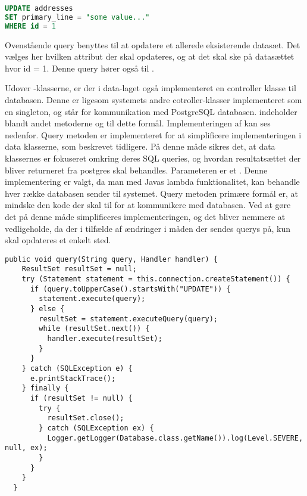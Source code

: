 \documentclass[../../main.tex]{subfiles}
\begin{document}
\begin{lstlisting}[language=sql, caption=DataAddress.save() - SQL INSERT,captionpos=b, label=DataAddress.save().sqlinsert]
UPDATE addresses 
SET primary_line = "some value..."
WHERE id = 1
\end{lstlisting}
Ovenstående query benyttes til at opdatere et allerede eksisterende datasæt. Det vælges her hvilken attribut der skal opdateres, og at det skal ske på datasættet hvor id = 1. Denne query hører også til .

Udover -klasserne, er der i data-laget også implementeret en controller klasse til databasen. Denne er ligesom systemets andre cotroller-klasser implementeret som en singleton, og står for kommunikation med PostgreSQL databasen.  indeholder blandt andet metoderne  og  til dette formål. Implementeringen af  kan ses nedenfor.
Query metoden er implementeret for at simplificere implementeringen i data klasserne, som beskrevet tidligere. På denne måde sikres det, at data klassernes er fokuseret omkring deres SQL queries, og hvordan resultatsættet der bliver returneret fra postgres skal behandles. Parameteren  er et . Denne implementering er valgt, da man med Javas lambda funktionalitet, kan behandle hver række databasen sender til systemet. 
	Query metoden primære formål er, at mindske den  kode der skal til for at kommunikere med databasen. Ved at gøre det på denne måde simplificeres implementeringen, og det bliver nemmere at vedligeholde, da der i tilfælde af ændringer i måden der sendes querys på, kun skal opdateres et enkelt sted. \\
    
\begin{lstlisting}[caption=Database.query(),captionpos=b, label=Database.query()]
public void query(String query, Handler handler) {
    ResultSet resultSet = null;
    try (Statement statement = this.connection.createStatement()) {
      if (query.toUpperCase().startsWith("UPDATE")) {
        statement.execute(query);
      } else {
        resultSet = statement.executeQuery(query);
        while (resultSet.next()) {
          handler.execute(resultSet);
        }
      }
    } catch (SQLException e) {
      e.printStackTrace();
    } finally {
      if (resultSet != null) {
        try {
          resultSet.close();
        } catch (SQLException ex) {
          Logger.getLogger(Database.class.getName()).log(Level.SEVERE, null, ex);
        }
      }
    }
  }

\end{lstlisting}
\end{document}
